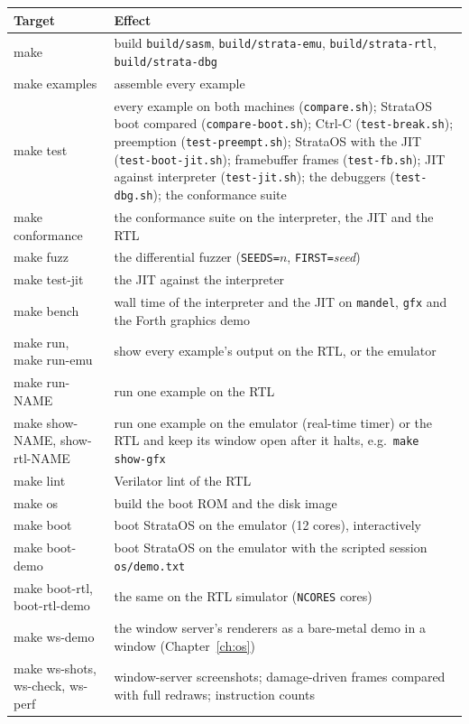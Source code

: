 \begin{center}\small
\begin{tabularx}{\linewidth}{@{}>{\ttfamily}l X@{}}
\toprule
\textrm{\bfseries Target} & \textbf{Effect}\\\midrule
make & build \texttt{build/sasm}, \texttt{build/strata-emu}, \texttt{build/strata-rtl}, \texttt{build/strata-dbg}\\
make examples & assemble every example\\
make test & every example on both machines (\texttt{compare.sh}); StrataOS boot compared (\texttt{compare-boot.sh}); Ctrl-C (\texttt{test-break.sh}); preemption (\texttt{test-preempt.sh}); StrataOS with the JIT (\texttt{test-boot-jit.sh}); framebuffer frames (\texttt{test-fb.sh}); JIT against interpreter (\texttt{test-jit.sh}); the debuggers (\texttt{test-dbg.sh}); the conformance suite\\
make conformance & the conformance suite on the interpreter, the JIT and the RTL\\
make fuzz & the differential fuzzer (\texttt{SEEDS=}$n$, \texttt{FIRST=}\textit{seed})\\
make test-jit & the JIT against the interpreter\\
make bench & wall time of the interpreter and the JIT on \texttt{mandel}, \texttt{gfx} and the Forth graphics demo\\
make run, make run-emu & show every example's output on the RTL, or the emulator\\
make run-NAME & run one example on the RTL\\
make show-NAME, show-rtl-NAME & run one example on the emulator (real-time timer) or the RTL and keep its window open after it halts, e.g.\ \texttt{make show-gfx}\\
make lint & Verilator lint of the RTL\\
make os & build the boot ROM and the disk image\\
make boot & boot StrataOS on the emulator (12 cores), interactively\\
make boot-demo & boot StrataOS on the emulator with the scripted session \texttt{os/demo.txt}\\
make boot-rtl, boot-rtl-demo & the same on the RTL simulator (\texttt{NCORES} cores)\\
make ws-demo & the window server's renderers as a bare-metal demo in a window (Chapter~\ref{ch:os})\\
make ws-shots, ws-check, ws-perf & window-server screenshots; damage-driven frames compared with full redraws; instruction counts\\

\end{tabularx}
\end{center}
